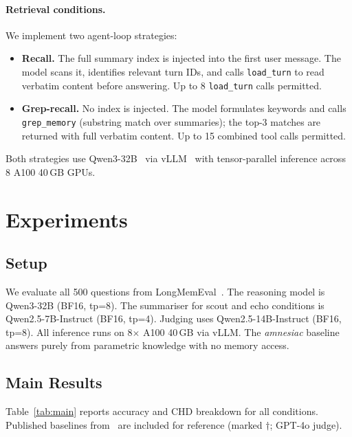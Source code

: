 \documentclass[11pt,twocolumn]{article}
\begin{document}
\paragraph{Retrieval conditions.} We implement two agent-loop strategies:
\begin{itemize}[leftmargin=*,itemsep=0pt,topsep=2pt]
  \item \textbf{Recall.} The full summary index is injected into the
        first user message. The model scans it, identifies relevant
        turn IDs, and calls \texttt{load\_turn} to read verbatim content
        before answering. Up to 8 \texttt{load\_turn} calls permitted.
  \item \textbf{Grep-recall.} No index is injected. The model formulates
        keywords and calls \texttt{grep\_memory} (substring match over
        summaries); the top-3 matches are returned with full verbatim
        content. Up to 15 combined tool calls permitted.
\end{itemize}
Both strategies use Qwen3-32B~\cite{qwen3} via vLLM~\cite{kwon2023vllm}
with tensor-parallel inference across 8 A100 40\,GB GPUs.

\section{Experiments}
\label{sec:experiments}

\subsection{Setup}

We evaluate all 500 questions from LongMemEval~\cite{wu2025longmemeval}.
The reasoning model is Qwen3-32B (BF16, tp=8). The summariser for
scout and echo conditions is Qwen2.5-7B-Instruct (BF16, tp=4). Judging
uses Qwen2.5-14B-Instruct (BF16, tp=8). All inference runs on 8$\times$
A100 40\,GB via vLLM. The \textit{amnesiac} baseline answers purely from
parametric knowledge with no memory access.

\subsection{Main Results}

Table~\ref{tab:main} reports accuracy and CHD breakdown for all
conditions. Published baselines from~\citet{wu2025longmemeval} are
included for reference (marked $\dagger$; GPT-4o judge).
\end{document}
